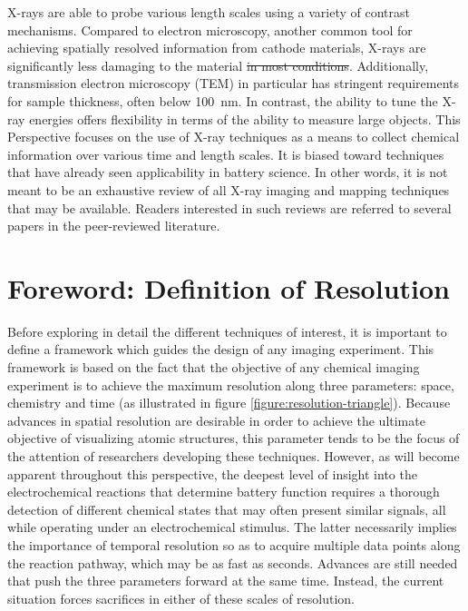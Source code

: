\documentclass[journal=cmatex,manuscript=perspective]{achemso}
\providecommand{\DIFaddtex}[1]{{\protect\color{blue}\uwave{#1}}} %
\providecommand{\DIFdeltex}[1]{{\protect\color{red}\sout{#1}}}                      %
\providecommand{\DIFaddbegin}{} %
\providecommand{\DIFaddend}{} %
\providecommand{\DIFdelbegin}{} %
\providecommand{\DIFdelend}{} %
\providecommand{\DIFadd}[1]{\texorpdfstring{\DIFaddtex{#1}}{#1}} %
\providecommand{\DIFdel}[1]{\texorpdfstring{\DIFdeltex{#1}}{}} %
\begin{document}
X-rays are able to probe various length scales using a variety of
contrast mechanisms. Compared to electron microscopy, another common
tool for achieving spatially resolved information from cathode
materials, X-rays are significantly less damaging to the material
\DIFdelbegin \DIFdel{in
most conditions}\DIFdelend \DIFaddbegin \DIFadd{under most circumstances}\DIFaddend . Additionally, transmission electron
microscopy (TEM) in particular has stringent requirements for sample
thickness, often below \SI{100}{nm}. In contrast, the ability to tune
the X-ray energies offers flexibility in terms of the ability to
measure large objects. This Perspective focuses on the use of X-ray
techniques as a means to collect chemical information over various
time and length scales. It is biased toward techniques that have
already seen applicability in battery science. In other words, it is
not meant to be an exhaustive review of all X-ray imaging and mapping
techniques that may be available. Readers interested in such reviews
are referred to several papers in the peer-reviewed
literature\cite{rose2013, maire2014, monteiro2013, kawahara2015}.

\section{Foreword: Definition of Resolution}

Before exploring in detail the different techniques of interest, it is
important to define a framework which guides the design of any imaging
experiment. This framework is based on the fact that the objective of
any chemical imaging experiment is to achieve the maximum resolution
along three parameters: space, chemistry and time (as illustrated in
figure \ref{figure:resolution-triangle}). Because advances in spatial
resolution are desirable in order to achieve the ultimate objective of
visualizing atomic structures, this parameter tends to be the focus of
the attention of researchers developing these techniques. However, as
will become apparent throughout this perspective, the deepest level of
insight into the electrochemical reactions that determine battery
function requires a thorough detection of different chemical states
that may often present similar signals, all while operating under an
electrochemical stimulus. The latter necessarily implies the
importance of temporal resolution so as to acquire multiple data
points along the reaction pathway, which may be as fast as
seconds. Advances are still needed that push the three parameters
forward at the same time. Instead, the current situation forces
sacrifices in either of these scales of resolution.
\end{document}
